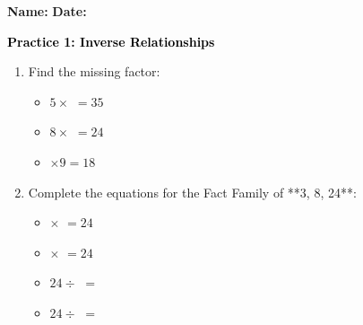\documentclass[12pt, letterpaper, fleqn]{article}
\newcommand{\blank}{\underline{\hspace{2.2cm}}}
\begin{document}
\textbf{Name:} \underline{\hspace{5cm}}
\hfill
\textbf{Date:} \underline{\hspace{3cm}}\\

\begin{tcolorbox}[colback=customteal!20]
    \large\textcolor{black}{\textbf{Practice 1: Inverse Relationships}}
\end{tcolorbox}

\vspace{5mm}
\begin{enumerate}[itemsep=2.5cm, leftmargin=0.6cm]
\item Find the missing factor:
\begin{itemize}[itemsep=1cm]
  \item $5 \times$ \blank $= 35$
  \item $8 \times$ \blank $= 24$
  \item \blank $\times 9 = 18$
\end{itemize}

\item Complete the equations for the Fact Family of **3, 8, 24**:
\begin{itemize}[itemsep=0.8cm]
  \item \blank $\times$ \blank $= 24$
  \item \blank $\times$ \blank $= 24$
  \item $24 \div$ \blank $=$ \blank
  \item $24 \div$ \blank $=$ \blank
\end{itemize}
\end{enumerate}
\end{document}
